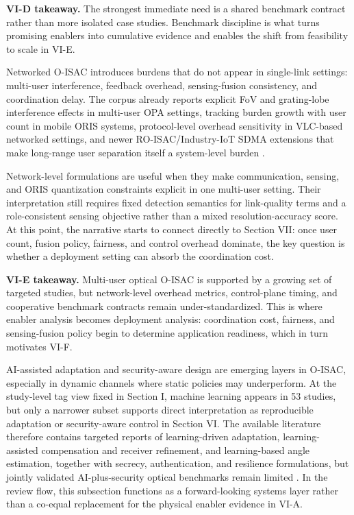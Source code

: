 \documentclass[letterpaper,journal]{IEEEtran}
\begin{document}
\textbf{VI-D takeaway.} The strongest immediate need is a shared benchmark contract rather than more isolated case studies. Benchmark discipline is what turns promising enablers into cumulative evidence and enables the shift from feasibility to scale in VI-E.

Networked O-ISAC introduces burdens that do not appear in single-link settings: multi-user interference, feedback overhead, sensing-fusion consistency, and coordination delay. The corpus already reports explicit FoV and grating-lobe interference effects in multi-user OPA settings, tracking burden growth with user count in mobile ORIS systems, protocol-level overhead sensitivity in VLC-based networked settings, and newer RO-ISAC/Industry-IoT SDMA extensions that make long-range user separation itself a system-level burden .

Network-level formulations are useful when they make communication, sensing, and ORIS quantization constraints explicit in one multi-user setting. Their interpretation still requires fixed detection semantics for link-quality terms and a role-consistent sensing objective rather than a mixed resolution-accuracy score. At this point, the narrative starts to connect directly to Section VII: once user count, fusion policy, fairness, and control overhead dominate, the key question is whether a deployment setting can absorb the coordination cost.

\textbf{VI-E takeaway.} Multi-user optical O-ISAC is supported by a growing set of targeted studies, but network-level overhead metrics, control-plane timing, and cooperative benchmark contracts remain under-standardized. This is where enabler analysis becomes deployment analysis: coordination cost, fairness, and sensing-fusion policy begin to determine application readiness, which in turn motivates VI-F.

AI-assisted adaptation and security-aware design are emerging layers in O-ISAC, especially in dynamic channels where static policies may underperform. At the study-level tag view fixed in Section I, machine learning appears in 53 studies, but only a narrower subset supports direct interpretation as reproducible adaptation or security-aware control in Section VI. The available literature therefore contains targeted reports of learning-driven adaptation, learning-assisted compensation and receiver refinement, and learning-based angle estimation, together with secrecy, authentication, and resilience formulations, but jointly validated AI-plus-security optical benchmarks remain limited . In the review flow, this subsection functions as a forward-looking systems layer rather than a co-equal replacement for the physical enabler evidence in VI-A.
\end{document}
